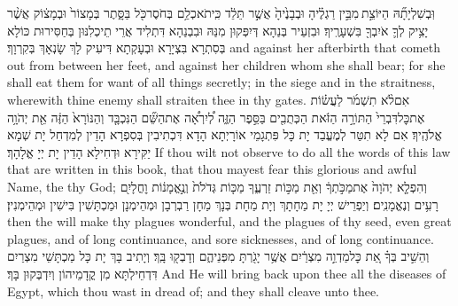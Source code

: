 {וּֽבְשִׁלְיָתָ֞הּ הַיּוֹצֵ֣ת \legarmeh  מִבֵּ֣ין רַגְלֶ֗יהָ וּבְבָנֶ֙יהָ֙ אֲשֶׁ֣ר תֵּלֵ֔ד כִּֽי\maqqaf תֹאכְלֵ֥ם בְּחֹסֶר\maqqaf כֹּ֖ל בַּסָּ֑תֶר בְּמָצוֹר֙ וּבְמָצ֔וֹק אֲשֶׁ֨ר יָצִ֥יק לְךָ֛ אֹיִבְךָ֖ בִּשְׁעָרֶֽיךָ׃}
{וּבִזְעֵיר בְּנַהָא דְּיִפְּקוּן מִנַּהּ וּבִבְנַהָא דִּתְלִיד אֲרֵי תֵיכְלִנּוּן בְּחַסִּירוּת כּוֹלָא בְּסִתְרָא בִּצְיָרָא וּבְעָקְתָא דִּיעִיק לָךְ שָׂנְאָךְ בְּקִרְוָךְ׃}
{and against her afterbirth that cometh out from between her feet, and against her children whom she shall bear; for she shall eat them for want of all things secretly; in the siege and in the straitness, wherewith thine enemy shall straiten thee in thy gates.}{}
{אִם\maqqaf לֹ֨א תִשְׁמֹ֜ר לַעֲשׂ֗וֹת אֶת\maqqaf כׇּל\maqqaf דִּבְרֵי֙ הַתּוֹרָ֣ה הַזֹּ֔את הַכְּתֻבִ֖ים בַּסֵּ֣פֶר הַזֶּ֑ה לְ֠יִרְאָ֠ה אֶת\maqqaf הַשֵּׁ֞ם הַנִּכְבָּ֤ד וְהַנּוֹרָא֙ הַזֶּ֔ה אֵ֖ת יְהֹוָ֥ה אֱלֹהֶֽיךָ׃}
{אִם לָא תִטַּר לְמֶעֱבַד יָת כָּל פִּתְגָמֵי אוֹרָיְתָא הָדָא דִּכְתִיבִין בְּסִפְרָא הָדֵין לְמִדְחַל יָת שְׁמָא יַקִּירָא וּדְחִילָא הָדֵין יָת יְיָ אֱלָהָךְ׃}
{If thou wilt not observe to do all the words of this law that are written in this book, that thou mayest fear this glorious and awful Name, the \lord\space thy God;}{}
{וְהִפְלָ֤א יְהֹוָה֙ אֶת\maqqaf מַכֹּ֣תְךָ֔ וְאֵ֖ת מַכּ֣וֹת זַרְעֶ֑ךָ מַכּ֤וֹת גְּדֹלֹת֙ וְנֶ֣אֱמָנ֔וֹת וׇחֳלָיִ֖ם רָעִ֥ים וְנֶאֱמָנִֽים׃}
{וְיַפְרֵישׁ יְיָ יָת מַחָתָךְ וְיָת מַחָת בְּנָךְ מַחָן רַבְרְבָן וּמְהֵימְנָן וּמַכְתָּשִׁין בִּישִׁין וּמְהֵימְנִין׃}
{then the \lord\space will make thy plagues wonderful, and the plagues of thy seed, even great plagues, and of long continuance, and sore sicknesses, and of long continuance.}{}
{וְהֵשִׁ֣יב בְּךָ֗ אֵ֚ת כׇּל\maqqaf מַדְוֵ֣ה מִצְרַ֔יִם אֲשֶׁ֥ר יָגֹ֖רְתָּ מִפְּנֵיהֶ֑ם וְדָבְק֖וּ בָּֽךְ׃}
{וְיָתִיב בָּךְ יָת כָּל מַכְתָּשֵׁי מִצְרַיִם דִּדְחֵילְתָּא מִן קֳדָמֵיהוֹן וְיִדְבְּקוּן בָּךְ׃}
{And He will bring back upon thee all the diseases of Egypt, which thou wast in dread of; and they shall cleave unto thee.}{}
